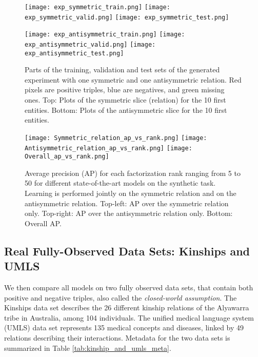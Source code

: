 \documentclass[twoside,11pt]{article}
\renewcommand{\cite}{\citep}
\begin{document}
\begin{figure}[ht]
	\centering
	\texttt{[image: exp\_symmetric\_train.png]}
	\texttt{[image: exp\_symmetric\_valid.png]}
	\texttt{[image: exp\_symmetric\_test.png]}
	
	\texttt{[image: exp\_antisymmetric\_train.png]}
	\texttt{[image: exp\_antisymmetric\_valid.png]}
	\texttt{[image: exp\_antisymmetric\_test.png]}

    \caption{Parts of the training, validation and test sets of the generated experiment with one symmetric and one antisymmetric relation. Red pixels are positive triples, blue are negatives, and green missing ones. Top: Plots of the symmetric slice (relation) for the 10 first entities. Bottom: Plots of the antisymmetric slice for the 10 first entities.}
	\label{fig:symmetry_example}
\end{figure}










\begin{figure*}[ht]{{\extracolsep{8pt}}}
	\centering
	\texttt{[image: Symmetric\_relation\_ap\_vs\_rank.png]}
	\texttt{[image: Antisymmetric\_relation\_ap\_vs\_rank.png]} 
	\texttt{[image: Overall\_ap\_vs\_rank.png]}
\caption{Average precision (AP) for each factorization rank ranging from 5 to 50 for different state-of-the-art models on the synthetic task. Learning is performed jointly on the symmetric relation and on the antisymmetric relation. Top-left: AP over the symmetric relation only. Top-right: AP over the antisymmetric relation only. Bottom: Overall AP.}
	\label{fig:exp_sym_antisym}
\end{figure*}




\subsection{Real Fully-Observed Data Sets: Kinships and UMLS}
\label{sec:kinships_umls}

We then compare all models on two fully observed data sets, that
contain both positive and negative triples, also called the \emph{closed-world
assumption}.
The Kinships data set \cite{denham1973detection}
describes the 26 different kinship relations of the Alyawarra tribe in Australia, among 104 individuals.
The unified medical language system (UMLS) data set \cite{mccray2003upper} represents 135 medical concepts and diseases, linked
by 49 relations describing their interactions. 
Metadata for the two data sets is summarized in Table
\ref{tab:kinship_and_umls_meta}.
\end{document}
